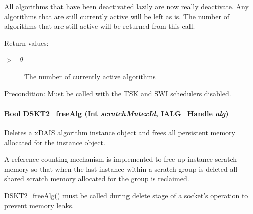 All algorithms that have been deactivated lazily are now really deactivate. Any algorithms that are still currently active will be left as is. The number of algorithms that are still active will be returned from this call. 

\begin{Desc}
\item[Return values:]
\begin{description}
\item[{\em $>$=0}]The number of currently active algorithms\end{description}
\end{Desc}
\begin{Desc}
\item[Precondition:]Must be called with the TSK and SWI schedulers disabled. \end{Desc}
\hypertarget{group___d_s_p_d_s_k_t2_g8dffa02b3ca1ff6856ce3cf610be7435}{
\paragraph[DSKT2\_\-freeAlg]{\setlength{\rightskip}{0pt plus 5cm}Bool DSKT2\_\-free\-Alg (Int {\em scratch\-Mutex\-Id}, \hyperlink{struct_i_a_l_g___obj}{IALG\_\-Handle} {\em alg})}\hfill}
\label{group___d_s_p_d_s_k_t2_g8dffa02b3ca1ff6856ce3cf610be7435}


Deletes a x\-DAIS algorithm instance object and frees all persistent memory allocated for the instance object. 

A reference counting mechanism is implemented to free up instance scratch memory so that when the last instance within a scratch group is deleted all shared scratch memory allocated for the group is reclaimed.

\hyperlink{group___d_s_p_d_s_k_t2_g8dffa02b3ca1ff6856ce3cf610be7435}{DSKT2\_\-free\-Alg()} must be called during delete stage of a socket's operation to prevent memory leaks.

